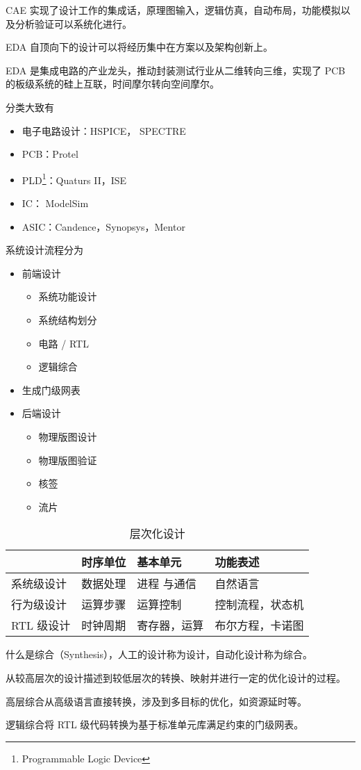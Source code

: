\documentclass[cn,11pt,chinese,black,simple]{../elegantbook}
\begin{document}
CAE 实现了设计工作的集成话，原理图输入，逻辑仿真，自动布局，功能模拟以及分析验证可以系统化进行。

EDA 自顶向下的设计可以将经历集中在方案以及架构创新上。

EDA 是集成电路的产业龙头，推动封装测试行业从二维转向三维，实现了 PCB 的板级系统的硅上互联，时间摩尔转向空间摩尔。

分类大致有

\begin{itemize}
    \item 电子电路设计：HSPICE， SPECTRE
    \item PCB：Protel
    \item PLD\footnote{Programmable Logic Device}：Quaturs II，ISE
    \item IC： ModelSim
    \item ASIC：Candence，Synopsys，Mentor
\end{itemize}


系统设计流程分为 

\begin{itemize}
    \item 前端设计
    \begin{itemize}
        \item 系统功能设计
        \item 系统结构划分
        \item 电路 / RTL 
        \item 逻辑综合
    \end{itemize}
    \item 生成门级网表
    \item 后端设计
    \begin{itemize}
        \item 物理版图设计
        \item 物理版图验证
        \item 核签
        \item 流片
    \end{itemize}
\end{itemize}

\begin{table}[htb]
    \centering
    \caption{层次化设计}
    \begin{tabular}{llll}
    \hline
          & 时序单位 & 基本单元   & 功能表述 \\ \hline
    系统级设计 & 数据处理 & 进程 与通信 & 自然语言 \\
     行为级设计     &  运算步骤    &  运算控制      &  控制流程，状态机    \\
        RTL 级设计  &  时钟周期    &   寄存器，运算     &  布尔方程，卡诺图    \\ \hline
    \end{tabular}
    \end{table}

什么是综合（Synthesis），人工的设计称为设计，自动化设计称为综合。

\begin{definition}[综合]
    从较高层次的设计描述到较低层次的转换、映射并进行一定的优化设计的过程。
\end{definition}

高层综合从高级语言直接转换，涉及到多目标的优化，如资源延时等。

逻辑综合将 RTL 级代码转换为基于标准单元库满足约束的门级网表。




\let\chapname\undefined
\ifx\mainclass\undefined
\end{document}
